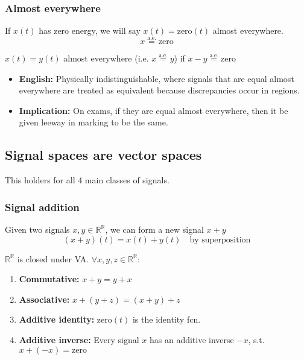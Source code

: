     \subsubsection{Almost everywhere}
    \begin{definition}
        If $x(t)$ has zero energy, we will say $x(t) = \text{zero}(t)$ almost everywhere.
        \begin{equation}
            x \overset{\text{a.e.}}{=} \text{zero}
        \end{equation}

        $x(t) = y(t)$ almost everywhere (i.e.  $x \overset{\text{a.e.}}{=} y$) if $x-y \overset{\text{a.e.}}{=} \text{zero}$
        \begin{itemize}
            \item \textbf{English:} Physically indistinguishable, where signals that are equal almost everywhere are treated as equivalent because discrepancies occur in regions.
            \item \textbf{Implication:} On exams, if they are equal almost everywhere, then it be given leeway in marking to be the same. 
        \end{itemize}
    \end{definition}

\subsection{Signal spaces are vector spaces}
    This holders for all 4 main classes of signals. 

    \subsubsection{Signal addition}
    \begin{definition}
        Given two signals $x,y\in \mathbb{R}^\mathbb{R}$, we can form a new signal $x+y$
        \begin{equation}
            (x+y)(t) = x(t) + y(t) \quad \text{by superposition}
        \end{equation}
        \vspace{1em}

        $\mathbb{R}^\mathbb{R}$ is closed under VA. $\forall x,y,z \in \mathbb{R}^{\mathbb{R}}$:
        \begin{enumerate}
            \item \textbf{Commutative:} $x+y=y+x$
            \item \textbf{Associative:} $x+(y+z) = (x+y) + z$
            \item \textbf{Additive identity:} $\text{zero}(t)$ is the identity fcn.
            \item \textbf{Additive inverse:} Every signal $x$ has an additive inverse $-x$, s.t. $x+(-x)=\text{zero}$
        \end{enumerate}
    \end{definition}

